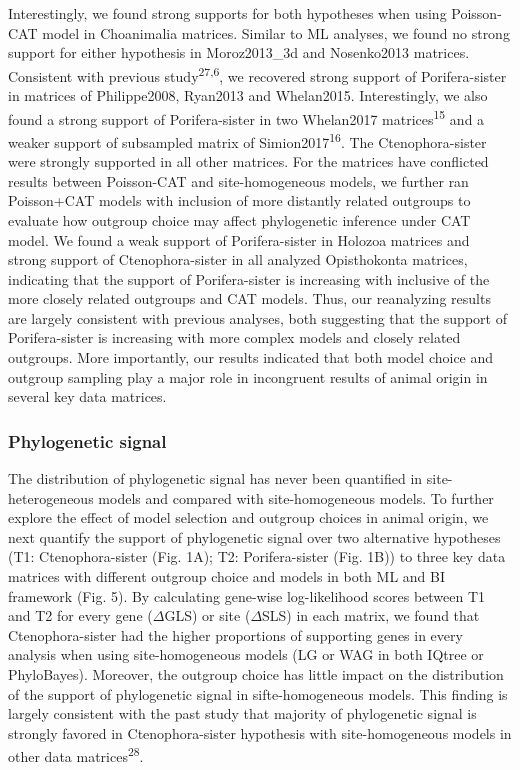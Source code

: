 \documentclass[]{article}
\begin{document}
Interestingly, we found strong supports for both hypotheses when using
Poisson-CAT model in Choanimalia matrices. Similar to ML analyses, we
found no strong support for either hypothesis in Moroz2013\_3d and
Nosenko2013 matrices. Consistent with previous
study\textsuperscript{27,6}, we recovered strong support of
Porifera-sister in matrices of Philippe2008, Ryan2013 and Whelan2015.
Interestingly, we also found a strong support of Porifera-sister in two
Whelan2017 matrices\textsuperscript{15} and a weaker support of
subsampled matrix of Simion2017\textsuperscript{16}. The
Ctenophora-sister were strongly supported in all other matrices. For the
matrices have conflicted results between Poisson-CAT and
site-homogeneous models, we further ran Poisson+CAT models with
inclusion of more distantly related outgroups to evaluate how outgroup
choice may affect phylogenetic inference under CAT model. We found a
weak support of Porifera-sister in Holozoa matrices and strong support
of Ctenophora-sister in all analyzed Opisthokonta matrices, indicating
that the support of Porifera-sister is increasing with inclusive of the
more closely related outgroups and CAT models. Thus, our reanalyzing
results are largely consistent with previous analyses, both suggesting
that the support of Porifera-sister is increasing with more complex
models and closely related outgroups. More importantly, our results
indicated that both model choice and outgroup sampling play a major role
in incongruent results of animal origin in several key data matrices.

\hypertarget{phylogenetic-signal}{%
\subsubsection{Phylogenetic signal}\label{phylogenetic-signal}}

The distribution of phylogenetic signal has never been quantified in
site-heterogeneous models and compared with site-homogeneous models. To
further explore the effect of model selection and outgroup choices in
animal origin, we next quantify the support of phylogenetic signal over
two alternative hypotheses (T1: Ctenophora-sister (Fig. 1A); T2:
Porifera-sister (Fig. 1B)) to three key data matrices with different
outgroup choice and models in both ML and BI framework (Fig. 5). By
calculating gene-wise log-likelihood scores between T1 and T2 for every
gene (\(\Delta\)GLS) or site (\(\Delta\)SLS) in each matrix, we found
that Ctenophora-sister had the higher proportions of supporting genes in
every analysis when using site-homogeneous models (LG or WAG in both
IQtree or PhyloBayes). Moreover, the outgroup choice has little impact
on the distribution of the support of phylogenetic signal in
sifte-homogeneous models. This finding is largely consistent with the
past study that majority of phylogenetic signal is strongly favored in
Ctenophora-sister hypothesis with site-homogeneous models in other data
matrices\textsuperscript{28}.
\end{document}
